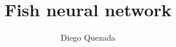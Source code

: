\documentclass[twocolumn]{article}
\title{Fish neural network}
\author{Diego Quezada}
\begin{document}
\sloppy %

\maketitle

















\newpage


\end{document}
